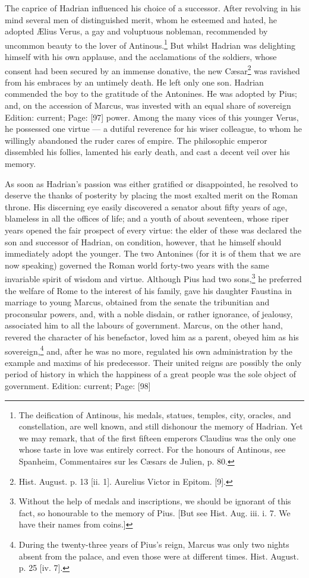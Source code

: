 The caprice of Hadrian influenced his choice of a successor. After revolving in his mind several men of distinguished merit, whom he esteemed and hated, he adopted Ælius Verus, a gay and voluptuous nobleman, recommended by uncommon beauty to the lover of Antinous.\footnote{The deification of Antinous, his medals, statues, temples, city, oracles, and constellation, are well known, and still dishonour the memory of Hadrian. Yet we may remark, that of the first fifteen emperors Claudius was the only one whose taste in love was entirely correct. For the honours of Antinous, see Spanheim, Commentaires sur les Cæsars de Julien, p. 80.} But whilst Hadrian was delighting himself with his own applause, and the acclamations of the soldiers, whose consent had been secured by an immense donative, the new Cæsar\footnote{Hist. August. p. 13 [ii. 1]. Aurelius Victor in Epitom. [9].} was ravished from his embraces by an untimely death. He left only one son. Hadrian commended the boy to the gratitude of the Antonines. He was adopted by Pius; and, on the accession of Marcus, was invested with an equal share of sovereign Edition: current; Page: [97] power. Among the many vices of this younger Verus, he possessed one virtue \texthebrew{—} a dutiful reverence for his wiser colleague, to whom he willingly abandoned the ruder cares of empire. The philosophic emperor dissembled his follies, lamented his early death, and cast a decent veil over his memory.

As soon as Hadrian\texthebrew{}’s passion was either gratified or disappointed, he resolved to deserve the thanks of posterity by placing the most exalted merit on the Roman throne. His discerning eye easily discovered a senator about fifty years of age, blameless in all the offices of life; and a youth of about seventeen, whose riper years opened the fair prospect of every virtue: the elder of these was declared the son and successor of Hadrian, on condition, however, that he himself should immediately adopt the younger. The two Antonines (for it is of them that we are now speaking) governed the Roman world forty-two years with the same invariable spirit of wisdom and virtue. Although Pius had two sons,\footnote{Without the help of medals and inscriptions, we should be ignorant of this fact, so honourable to the memory of Pius. [But see Hist. Aug. iii. i. 7. We have their names from coins.]} he preferred the welfare of Rome to the interest of his family, gave his daughter Faustina in marriage to young Marcus, obtained from the senate the tribunitian and proconsular powers, and, with a noble disdain, or rather ignorance, of jealousy, associated him to all the labours of government. Marcus, on the other hand, revered the character of his benefactor, loved him as a parent, obeyed him as his sovereign,\footnote{During the twenty-three years of Pius\texthebrew{}’s reign, Marcus was only two nights absent from the palace, and even those were at different times. Hist. August. p. 25 [iv. 7].} and, after he was no more, regulated his own administration by the example and maxims of his predecessor. Their united reigns are possibly the only period of history in which the happiness of a great people was the sole object of government.
Edition: current; Page: [98]

